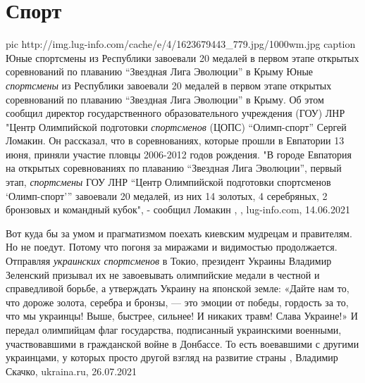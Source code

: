  
 
 
 
 
\chapter{Спорт}
\label{sec:slova.sport}

\ifcmt
  pic http://img.lug-info.com/cache/e/4/1623679443_779.jpg/1000wm.jpg
  caption Юные спортсмены из Республики завоевали 20 медалей в первом этапе открытых соревнований по плаванию \enquote{Звездная Лига Эволюции} в Крыму
\fi
Юные \emph{спортсмены} из Республики завоевали 20 медалей в первом этапе открытых
соревнований по плаванию \enquote{Звездная Лига Эволюции} в Крыму. Об этом сообщил
директор государственного образовательного учреждения (ГОУ) ЛНР "Центр
Олимпийской подготовки \emph{спортсменов} (ЦОПС) \enquote{Олимп-спорт} Сергей Ломакин.
Он рассказал, что в соревнованиях, которые прошли в Евпатории 13 июня, приняли
участие пловцы 2006-2012 годов рождения.
"В городе Евпатория на открытых соревнованиях по плаванию 
\enquote{Звездная Лига
Эволюции}, первый этап, \emph{спортсмены} ГОУ ЛНР \enquote{Центр Олимпийской подготовки
спортсменов \enquote{Олимп-спорт}} завоевали 20 медалей, из них 14 золотых, 4
серебряных, 2 бронзовых и командный кубок", - сообщил Ломакин
, 
, lug-info.com, 14.06.2021

Вот куда бы за умом и прагматизмом поехать киевским мудрецам и правителям. Но
не поедут. Потому что погоня за миражами и видимостью продолжается. Отправляя
\emph{украинских спортсменов} в Токио, президент Украины Владимир Зеленский
призывал их не завоевывать олимпийские медали в честной и справедливой борьбе,
а утверждать Украину на японской земле: «Дайте нам то, что дороже золота,
серебра и бронзы, — это эмоции от победы, гордость за то, что мы украинцы!
Выше, быстрее, сильнее! И никаких травм! Слава Украине!» И передал олимпийцам
флаг государства, подписанный украинскими военными, участвовавшими в
гражданской войне в Донбассе. То есть воевавшими с другими украинцами, у
которых просто другой взгляд на развитие страны
, 
Владимир Скачко, ukraina.ru, 26.07.2021

